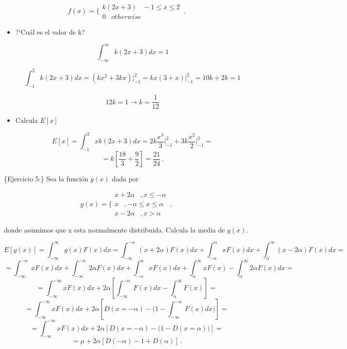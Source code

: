 \documentclass[
]{agujournal2019}
\begin{document}
\[f(x)=\Bigg\{\begin{array}{c}
          k(2x+3)\,\,\,\,\,-1\le x \le 2 \\ 0 \,\,\,\,\,otherwise
         \end{array} \,.\]

\begin{itemize}
\item ?`Cuál es el valor de k?

$$\int^{\infty}_{-\infty} k(2x+3)dx=1$$

$$\int^{2}_{-1} k(2x+3)dx=(kx^2 +3kx)\Big|^{2}_{-1}=kx(3+x)\Big|^{2}_{-1}=10k+2k=1$$

$$12k=1 \rightarrow k=\frac{1}{12}$$


\item Calcula $E[x]$

$$E[x]=\int^{2}_{-1}x k(2x+3)dx=2k\frac{x^3}{3}\Bigg|^{2}_{-1} + 3k\frac{x^2}{2}\Bigg|^{2}_{-1}=$$
$$=k\left[ \frac{18}{3} + \frac{9}{2}\right]=\frac{21}{24}\,.$$

\end{itemize}

\vspace{0.5cm}

\{\noindent  Ejercicio 5:\} Sea la función \(g(x)\) dada por

\[g(x)=\Bigg\{\begin{array}{c}
 x+2\alpha\,\,\,\,\,,x\le-\alpha \\
 x \,\,\,\,\,,-\alpha \le x \le \alpha \\
 x-2 \alpha \,\,\,\,\,,x>\alpha
       \end{array} \,,\]

donde asumimos que x esta normalmente distribuida. Calcula la media de
\(g(x)\).

\[E[g(x)]=\int^{\infty}_{-\infty} g(x) F(x) dx=\int^{-\alpha}_{-\infty} (x+2\alpha) F(x) dx +
\int^{\alpha}_{-\alpha} x F(x) dx + \int^{\infty}_{\alpha} (x-2\alpha) F(x) dx=\]
\[=\int^{-\alpha}_{-\infty} x F(x) dx + \int^{-\alpha}_{-\infty} 2 \alpha F(x) dx +
   \int^{\alpha}_{-\alpha} x F(x) dx + \int^{\infty}_{\alpha} x F(x) - \int^{\infty}_{\alpha} 2\alpha F(x)dx=\]
\[=\int^{-\infty}_{-\infty} x F(x) dx +  2\alpha \left[ \int^{-\alpha}_{-\infty} F(x) dx - \int^{\infty}_{\alpha}  F(x)\right]=\]
\[=\int^{-\infty}_{-\infty} x F(x) dx +  2\alpha \left[ D(x=-\alpha) - \Bigg(1-\int^{-\alpha}_{-\infty} F(x) dx\Bigg)\right]=\]
\[=\int^{-\infty}_{-\infty} x F(x) dx +  2\alpha \left[ D(x=-\alpha) - \Bigg(1-D(x=\alpha)\Bigg)\right]=\]
\[=\mu + 2 \alpha \left[ D(-\alpha) - 1 + D(\alpha) \right]\,.\]
\end{document}
